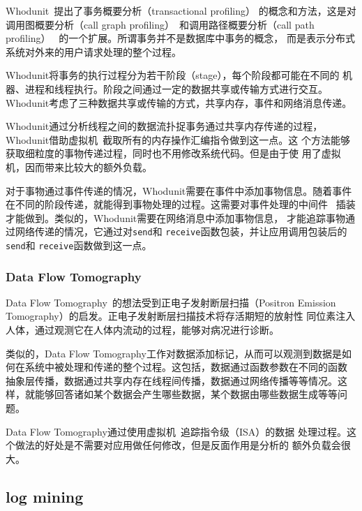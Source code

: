 Whodunit~\cite{whodunit}提出了事务概要分析（transactional profiling）
的概念和方法，这是对调用图概要分析（call graph
profiling）~\cite{Graham2004}和调用路径概要分析（call path profiling）~
\cite{Hall1992, Hall1993}的一个扩展。所谓事务并不是数据库中事务的概念，
而是表示分布式系统对外来的用户请求处理的整个过程。

Whodunit将事务的执行过程分为若干阶段（stage），每个阶段都可能在不同的
机器、进程和线程执行。阶段之间通过一定的数据共享或传输方式进行交互。
Whodunit考虑了三种数据共享或传输的方式，共享内存，事件和网络消息传递。

Whodunit通过分析线程之间的数据流扑捉事务通过共享内存传递的过程，
Whodunit借助虚拟机~\cite{qemu}截取所有的内存操作汇编指令做到这一点。这
个方法能够获取细粒度的事物传递过程，同时也不用修改系统代码。但是由于使
用了虚拟机，因而带来比较大的额外负载。

对于事物通过事件传递的情况，Whodunit需要在事件中添加事物信息。随着事件
在不同的阶段传递，就能得到事物处理的过程。这需要对事件处理的中间件
~\cite{seda}插装才能做到。类似的，Whodunit需要在网络消息中添加事物信息，
才能追踪事物通过网络传递的情况，它通过对\texttt{send}和
\texttt{receive}函数包装，并让应用调用包装后的\texttt{send}和
\texttt{receive}函数做到这一点。

\subsubsection*{Data Flow Tomography}

Data Flow Tomography~\cite{dft}的想法受到正电子发射断层扫描（Positron
Emission Tomography）的启发。正电子发射断层扫描技术将存活期短的放射性
同位素注入人体，通过观测它在人体内流动的过程，能够对病况进行诊断。

类似的，Data Flow Tomography工作对数据添加标记，从而可以观测到数据是如
何在系统中被处理和传递的整个过程。这包括，数据通过函数参数在不同的函数
抽象层传播，数据通过共享内存在线程间传播，数据通过网络传播等等情况。这
样，就能够回答诸如某个数据会产生哪些数据，某个数据由哪些数据生成等等问
题。

Data Flow Tomography通过使用虚拟机~\cite{qemu}追踪指令级（ISA）的数据
处理过程。这个做法的好处是不需要对应用做任何修改，但是反面作用是分析的
额外负载会很大。


\subsection{log mining}

